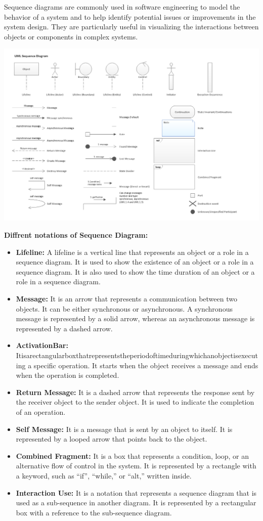 \documentclass{article}
\begin{document}
Sequence diagrams are commonly used in software engineering to model the behavior of a system and to help identify potential issues or improvements in the system design. They are particularly useful in visualizing the interactions between objects or components in complex systems.
\begin{center}
	\includegraphics[scale = 0.5]{notations.png}
\end{center}
\textbf{Diffrent notations of Sequence Diagram:}
\begin{itemize}
	\item \textbf{Lifeline:} A lifeline is a vertical line that represents an object or a role in a sequence diagram. It is used to show the existence of an object or a role in a sequence diagram. It is also used to show the time duration of an object or a role in a sequence diagram.
	\item \textbf{Message:} It is an arrow that represents a communication between two objects. It can be either synchronous or asynchronous. A synchronous message is represented by a solid arrow, whereas an asynchronous message is represented by a dashed arrow.
	\item \textbf{ActivationBar:} Itisarectangularboxthatrepresentstheperiodoftimeduringwhichanobjectisexecuting a specific operation. It starts when the object receives a message and ends when the operation is completed.
	\item \textbf{Return Message:} It is a dashed arrow that represents the response sent by the receiver object to the sender object. It is used to indicate the completion of an operation.
	\item \textbf{Self Message:} It is a message that is sent by an object to itself. It is represented by a looped arrow that points back to the object.
	\item \textbf{Combined Fragment:} It is a box that represents a condition, loop, or an alternative flow of control in the system. It is represented by a rectangle with a keyword, such as ``if'', ``while,'' or ``alt,'' written inside.
	\item \textbf{Interaction Use:} It is a notation that represents a sequence diagram that is used as a sub-sequence in another diagram. It is represented by a rectangular box with a reference to the sub-sequence diagram.
\end{itemize}
\end{document}
